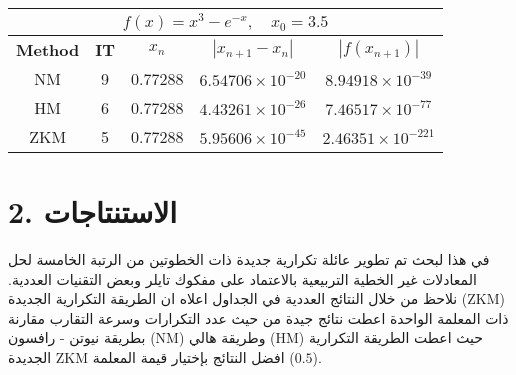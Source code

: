 \vspace{1cm}
\begin{table}[H]
	\caption{}
		\renewcommand{\arraystretch}{2}
	\centering
	\begin{english}
		\begin{tabular}{|c|c|c|c|c|}
			\hline
			\multicolumn{5}{|c|}{$f(x) = x^3 - e^{-x}, \quad x_0 = 3.5$}\\
			\hline
			\textbf{Method} & \textbf{IT} & $x_n$ & $|x_{n+1}-x_n|$& $|f(x_{n+1})|$ \\
			\hline
			NM & 9 & 0.77288 & $6.54706\times 10^{-20}$ & $8.94918\times 10^{-39}$\\
			HM & 6 & 0.77288 & $4.43261\times 10^{-26}$ & $7.46517\times 10^{-77}$\\
			ZKM & 5 & 0.77288 & $5.95606\times10^{-45}$ & $2.46351 \times10^{-221}$\\
			\hline
		\end{tabular}
	\end{english}
\end{table}

\section*{2. الاستنتاجات}
في هذا لبحث تم تطوير عائلة تكرارية جديدة ذات الخطوتين من الرتبة الخامسة لحل المعادلات غير الخطية التربيعية بالاعتماد على مفكوك تايلر وبعض التقنيات العددية. نلاحظ من خلال النتائج العددية في الجداول اعلاه ان الطريقة التكرارية الجديدة (ZKM) ذات المعلمة الواحدة اعطت نتائج جيدة من حيث عدد التكرارات وسرعة التقارب مقارنة بطريقة نيوتن - رافسون (NM) وطريقة هالي (HM) حيث اعطت الطريقة التكرارية الجديدة ZKM افضل النتائج بإختيار قيمة المعلمة ($0.5$).


